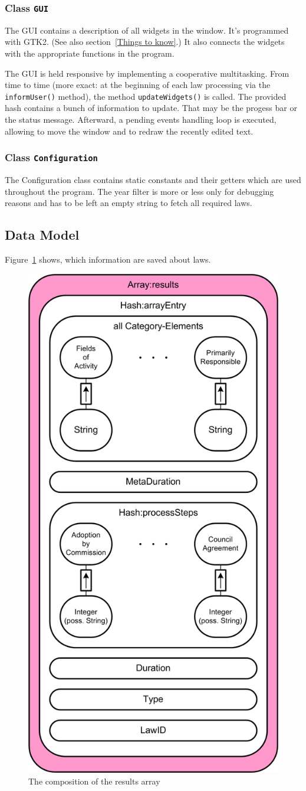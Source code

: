 \documentclass{scrartcl}
\begin{document}
\subsubsection{Class \texttt{GUI}}
The GUI contains a description of all widgets in the window. It's programmed with GTK2. (See also section~\ref{Things to know}.) It also connects the widgets with the appropriate functions in the program.

The GUI is held responsive by implementing a cooperative multitasking. From time to time (more exact: at the beginning of each law processing via the \texttt{informUser()} method), the method \texttt{updateWidgets()} is called. The provided hash contains a bunch of information to update. That may be the progess bar or the status message. Afterward, a pending events handling loop is executed, allowing to move the window and to redraw the recently edited text.



\subsubsection{Class \texttt{Configuration}}
The Configuration class contains static constants and their getters which are used throughout the program. The year filter is more or less only for debugging reasons and has to be left an empty string to fetch all required laws.



\subsection{Data Model}
Figure~\ref{DataModel} shows, which information are saved about laws.
  \begin{figure}[ht]
  \begin{center}
  \includegraphics[width = 0.5 \textwidth]{Data_Model.png}
  \caption{The composition of the results array}
  \label{DataModel}
  \end{center}
  \end{figure}
\end{document}
